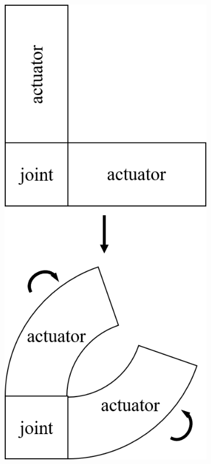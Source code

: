 \begin{figure}[ht]
	\centering
	\begin{subfigure}[c]{0.3\textwidth}
		\centering
		\includegraphics[width=\textwidth]{SR_JA.png}

\end{subfigure}
\end{figure}
